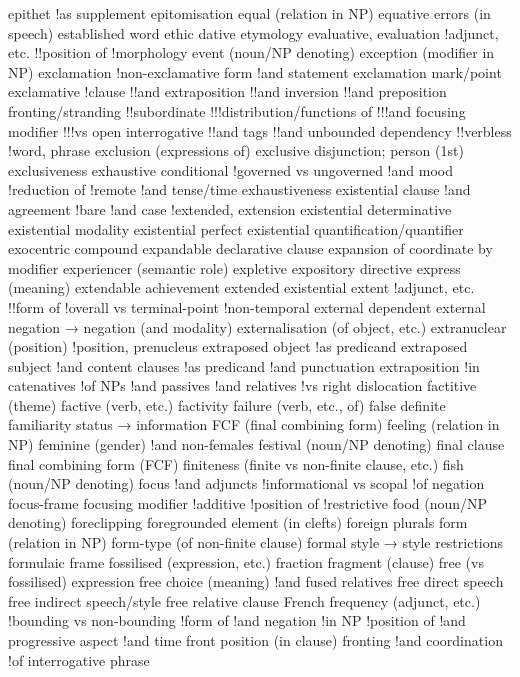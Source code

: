 epithet
!as supplement
epitomisation
equal (relation in NP)
equative
errors (in speech)
established word
ethic dative
etymology
evaluative, evaluation
!adjunct, etc.
!!position of
!morphology
event (noun/NP denoting)
exception (modifier in NP)
exclamation
!non-exclamative form
!and statement
exclamation mark/point
exclamative
!clause
!!and extraposition
!!and inversion
!!and preposition fronting/stranding
!!subordinate
!!!distribution/functions of
!!!and focusing modifier
!!!vs open interrogative
!!and tags
!!and unbounded dependency
!!verbless
!word, phrase
exclusion (expressions of)
exclusive disjunction; person (1st)
exclusiveness
exhaustive conditional
!governed vs ungoverned
!and mood
!reduction of
!remote
!and tense/time
exhaustiveness
existential clause
!and agreement
!bare
!and case
!extended, extension
existential determinative
existential modality
existential perfect
existential quantification/quantifier
exocentric compound
expandable declarative clause
expansion of coordinate by modifier
experiencer (semantic role)
expletive
expository directive
express (meaning)
extendable achievement
extended existential
extent
!adjunct, etc.
!!form of
!overall vs terminal-point
!non-temporal
external dependent
external negation → negation (and modality)
externalisation (of object, etc.)
extranuclear (position)
!position, prenucleus
extraposed object
!as predicand
extraposed subject
!and content clauses
!as predicand
!and punctuation
extraposition
!in catenatives
!of NPs
!and passives
!and relatives
!vs right dislocation
factitive (theme)
factive (verb, etc.) factivity
failure (verb, etc., of)
false definite
familiarity status → information
FCF (final combining form)
feeling (relation in NP)
feminine (gender)
!and non-females
festival (noun/NP denoting)
final clause
final combining form (FCF)
finiteness (finite vs non-finite clause, etc.)
fish (noun/NP denoting)
focus
!and adjuncts
!informational vs scopal
!of negation
focus-frame
focusing modifier
!additive
!position of
!restrictive
food (noun/NP denoting)
foreclipping
foregrounded element (in clefts)
foreign plurals
form (relation in NP)
form-type (of non-finite clause)
formal style → style restrictions
formulaic frame
fossilised (expression, etc.)
fraction
fragment (clause)
free (vs fossilised) expression
free choice (meaning)
!and fused relatives
free direct speech
free indirect speech/style
free relative clause
French
frequency (adjunct, etc.)
!bounding vs non-bounding
!form of
!and negation
!in NP
!position of
!and progressive aspect
!and time
front position (in clause)
fronting
!and coordination
!of interrogative phrase
